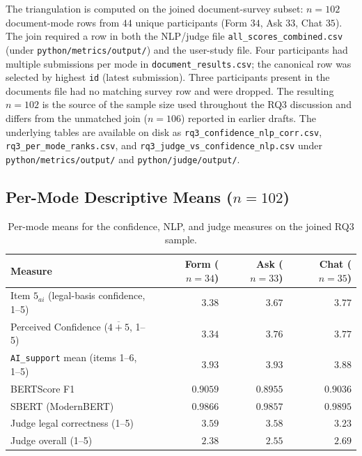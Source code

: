 The triangulation is computed on the joined document-survey
subset: $n = 102$ document-mode rows from $44$ unique participants
(Form $34$, Ask $33$, Chat $35$). The join required a row in both
the NLP/judge file
\texttt{all\_\allowbreak{}scores\_\allowbreak{}combined.csv} (under
\texttt{python/\allowbreak{}metrics/\allowbreak{}output/}) and the
user-study file. Four participants had multiple submissions per
mode in \texttt{document\_results.csv}; the canonical row was
selected by highest \texttt{id} (latest submission). Three
participants present in the documents file had no matching survey
row and were dropped. The resulting $n = 102$ is the source of the
sample size used throughout the RQ3 discussion and differs from
the unmatched join ($n = 106$) reported in earlier drafts. The
underlying tables are available on disk as
\texttt{rq3\_\allowbreak{}confidence\_\allowbreak{}nlp\_\allowbreak{}corr.csv},
\texttt{rq3\_\allowbreak{}per\_\allowbreak{}mode\_\allowbreak{}ranks.csv},
and
\texttt{rq3\_\allowbreak{}judge\_\allowbreak{}vs\_\allowbreak{}confidence\_\allowbreak{}nlp.csv}
under \texttt{python/\allowbreak{}metrics/\allowbreak{}output/} and
\texttt{python/\allowbreak{}judge/\allowbreak{}output/}.

\subsection{Per-Mode Descriptive Means ($n = 102$)}

\begin{table}[H]
\centering
\small
\begin{tabular}{@{}l r r r@{}}
\toprule
Measure & Form ($n = 34$) & Ask ($n = 33$) & Chat ($n = 35$) \\
\midrule
Item $5_{ai}$ (legal-basis confidence, 1--5)     & $3.38$ & $3.67$ & $3.77$ \\
Perceived Confidence ($\overline{4{+}5}$, 1--5)  & $3.34$ & $3.76$ & $3.77$ \\
\texttt{AI\_support} mean (items 1--6, 1--5)     & $3.93$ & $3.93$ & $3.88$ \\
BERTScore F1                                 & $0.9059$ & $0.8955$ & $0.9036$ \\
SBERT (ModernBERT)                           & $0.9866$ & $0.9857$ & $0.9895$ \\
Judge legal correctness (1--5)               & $3.59$ & $3.58$ & $3.23$ \\
Judge overall (1--5)                         & $2.38$ & $2.55$ & $2.69$ \\
\bottomrule
\end{tabular}
\caption{Per-mode means for the confidence, NLP, and judge measures
on the joined RQ3 sample.}
\label{tab:app-corr-means}
\end{table}

